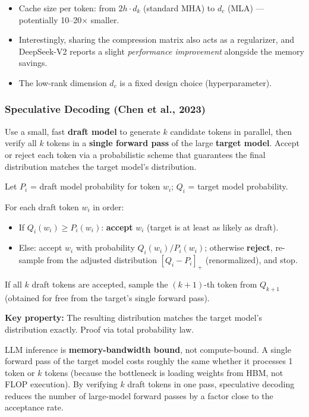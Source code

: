 \documentclass[11pt, a4paper]{article}
\begin{document}
\begin{itemize}[leftmargin=2em]
  \item Cache size per token: from $2h \cdot d_k$ (standard MHA) to $d_c$ (MLA) --- potentially 10--20$\times$ smaller.
  \item Interestingly, sharing the compression matrix also acts as a regularizer, and DeepSeek-V2 reports a slight \emph{performance improvement} alongside the memory savings.
  \item The low-rank dimension $d_c$ is a fixed design choice (hyperparameter).
\end{itemize}

\subsubsection{Speculative Decoding (Chen et al., 2023)}

\begin{defbox}
Use a small, fast \textbf{draft model} to generate $k$ candidate tokens in parallel, then verify all $k$ tokens in a \textbf{single forward pass} of the large \textbf{target model}. Accept or reject each token via a probabilistic scheme that guarantees the final distribution matches the target model's distribution.
\end{defbox}

\begin{mathbox}
Let $P_i$ = draft model probability for token $w_i$; $Q_i$ = target model probability.

For each draft token $w_i$ in order:
\begin{itemize}[leftmargin=1.5em]
  \item If $Q_i(w_i) \geq P_i(w_i)$: \textbf{accept} $w_i$ (target is at least as likely as draft).
  \item Else: accept $w_i$ with probability $Q_i(w_i) / P_i(w_i)$; otherwise \textbf{reject}, re-sample from the adjusted distribution $[Q_i - P_i]_+$ (renormalized), and stop.
\end{itemize}
If all $k$ draft tokens are accepted, sample the $(k+1)$-th token from $Q_{k+1}$ (obtained for free from the target's single forward pass).

\textbf{Key property:} The resulting distribution matches the target model's distribution exactly. Proof via total probability law.
\end{mathbox}

\begin{notebox}
LLM inference is \textbf{memory-bandwidth bound}, not compute-bound. A single forward pass of the target model costs roughly the same whether it processes 1 token or $k$ tokens (because the bottleneck is loading weights from HBM, not FLOP execution). By verifying $k$ draft tokens in one pass, speculative decoding reduces the number of large-model forward passes by a factor close to the acceptance rate.
\end{notebox}
\end{document}
